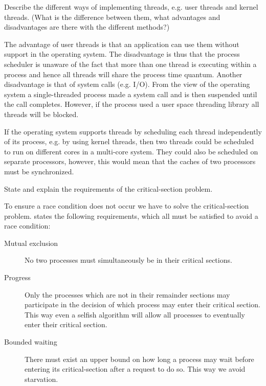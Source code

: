 \documentclass[a4paper,nocourse]{miunasgn}
\begin{document}
\begin{questions}
	\question\label{q:threads}
	Describe the different ways of implementing threads, e.g. user threads and 
	kernel threads.
	(What is the difference between them, what advantages and disadvantages are 
	there with the different methods?)
	\begin{solution}
		The advantage of user threads is that an application can use them without 
		support in the operating system.
		The disadvantage is thus that the process scheduler is unaware of the fact 
		that more than one thread is executing within a process and hence all 
		threads will share the process time quantum.
		Another disadvantage is that of system calls (e.g. I/O).
		From the view of the operating system a single-threaded process made 
		a system call and is then suspended until the call completes.
		However, if the process used a user space threading library all threads 
		will be blocked.

		If the operating system supports threads by scheduling each thread 
		independently of its process, e.g. by using kernel threads, then two 
		threads could be scheduled to run on different cores in a multi-core 
		system.
		They could also be scheduled on separate processors, however, this would 
		mean that the caches of two processors must be synchronized.
	\end{solution}

	
	\question\label{q:criticalsection}
	State and explain the requirements of the critical-section problem.
	\begin{solution}
		To ensure a race condition does not occur we have to solve the 
		critical-section problem.
		\citet[p. 228]{Silberschatz2009osc} states the following requirements, 
		which all must be satisfied to avoid a race condition:
		\begin{description}
			\item[Mutual exclusion] No two processes must simultaneously be in their 
				critical sections.
			\item[Progress] Only the processes which are not in their remainder 
				sections may participate in the decision of which process may enter 
				their critical section.
				This way even a selfish algorithm will allow all processes to 
				eventually enter their critical section.
			\item[Bounded waiting] There must exist an upper bound on how long 
				a process may wait before entering its critical-section after a request 
				to do so.
				This way we avoid starvation.
		\end{description}
	\end{solution}


\end{questions}
\end{document}
